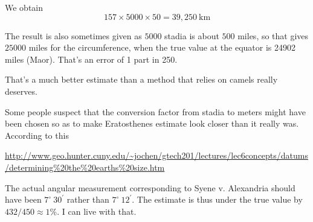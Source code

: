 \documentclass[11pt, oneside]{article}
\begin{document}
We obtain
\[ 157 \times 5000 \times 50 = 39,250 \ \text{km} \]

The result is also sometimes given as $5000$ stadia is about $500$ miles, so that gives $25000$ miles for the circumference, when the true value at the equator is 24902 miles (Maor).  That's an error of 1 part in 250.

That's a much better estimate than a method that relies on camels really deserves.  

Some people suspect that the conversion factor from stadia to meters might have been chosen so as to make Eratosthenes estimate look closer than it really was.  According to this

\url{http://www.geo.hunter.cuny.edu/~jochen/gtech201/lectures/lec6concepts/datums/determining%20the%20earths%20size.htm}

The actual angular measurement corresponding to Syene v. Alexandria should have been $7^{\circ} \ 30^{'}$ rather than $7^{\circ} \ 12^{'}$.  The estimate is thus under the true value by $432/450 \approx 1$\%.  I can live with that.
\end{document}
